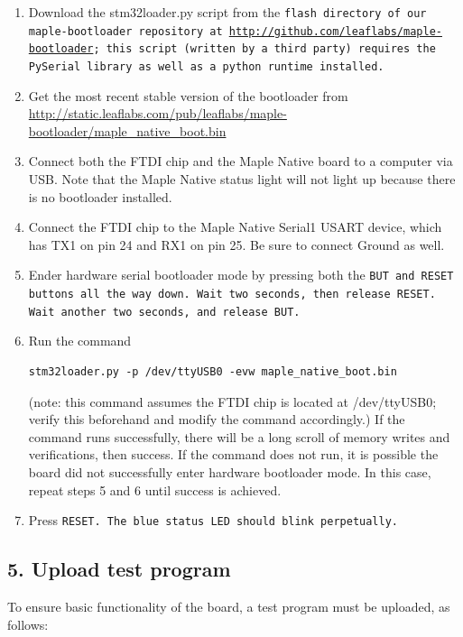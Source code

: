 \documentclass[a4paper,12pt]{report}
\begin{document}
\begin{enumerate}
\item Download the stm32loader.py script from the \tt flash \rm directory of our maple-bootloader repository at \url{http://github.com/leaflabs/maple-bootloader}; this script (written by a third party) requires the PySerial library as well as a python runtime installed.
\item Get the most recent stable version of the bootloader from \url{http://static.leaflabs.com/pub/leaflabs/maple-bootloader/maple_native_boot.bin}
\item Connect both the FTDI chip and the Maple Native board to a computer via USB. Note that the Maple Native status light will not light up because there is no bootloader installed. 
\item Connect the FTDI chip to the Maple Native Serial1 USART device, which has TX1 on pin 24 and RX1 on pin 25. Be sure to connect Ground as well.
\item Ender hardware serial bootloader mode by pressing both the \tt BUT \rm and \tt RESET \rm buttons all the way down. Wait two seconds, then release \tt RESET. \rm Wait another two seconds, and release \tt BUT. \rm
\item Run the command \begin{verbatim}stm32loader.py -p /dev/ttyUSB0 -evw maple_native_boot.bin\end{verbatim} (note: this command assumes the FTDI chip is located at /dev/ttyUSB0; verify this beforehand and modify the command accordingly.) If the command runs successfully, there will be a long scroll of memory writes and verifications, then success. If the command does not run, it is possible the board did not successfully enter hardware bootloader mode. In this case, repeat steps 5 and 6 until success is achieved.
\item Press \tt RESET. \rm The blue status LED should blink perpetually.
\end{enumerate}

\subsection*{5. Upload test program}
To ensure basic functionality of the board, a test program must be uploaded, as follows:
\end{document}
